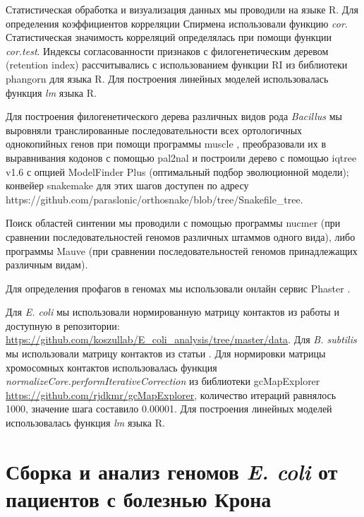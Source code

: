 Статистическая обработка и визуализация данных мы проводили на языке R. Для определения коэффициентов корреляции Спирмена использовали функцию \textit{cor}. Статистическая значимость корреляций определялась при помощи функции \textit{cor.test}. Индексы согласованности признаков с филогенетическим деревом (retention index) рассчитывались с использованием функции RI из библиотеки phangorn для языка R. Для построения линейных моделей использовалась функция \textit{lm} языка R.

Для построения филогенетического дерева различных видов рода \textit{Bacillus} мы выровняли транслированные последовательности всех ортологичных однокопийных генов при помощи программы muscle \cite{edgar2004muscle}, преобразовали их в выравнивания кодонов с помощью pal2nal и построили дерево с помощью iqtree v1.6 \cite{nguyen2015iq} с опцией ModelFinder Plus (оптимальный подбор эволюционной модели); конвейер snakemake для этих шагов доступен по адресу https://github.com/paraslonic/orthosnake/blob/tree/Snakefile\_tree. 

Поиск областей синтении мы проводили с помощью программы nucmer \cite{marccais2018mummer4}(при сравнении последовательностей геномов различных штаммов одного вида), либо программы Mauve \cite{darling2004mauve} (при сравнении последовательностей геномов принадлежащих различным видам).

Для определения профагов в геномах мы использовали онлайн сервис Phaster \cite{arndt2016phaster}. 

Для \textit{E. coli} мы использовали нормированную матрицу контактов из работы \cite{lioy2018multiscale} и доступную в репозитории: \url{https://github.com/koszullab/E_coli_analysis/tree/master/data}. Для \textit{B. subtilis} мы использовали матрицу контактов из статьи \cite{marbouty2015condensin}. Для нормировки матрицы хромосомных контактов использовалась функция  \textit{normalizeCore.performIterativeCorrection} из библиотеки gcMapExplorer \url{https://github.com/rjdkmr/gcMapExplorer}, количество итераций равнялось 1000, значение шага составило 0.00001. Для построения линейных моделей использовалась функция \textit{lm} языка R.

\section{Сборка и анализ геномов \textit{E. coli} от пациентов с болезнью Крона}

